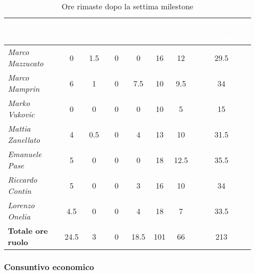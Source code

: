 \begin{table}[H]
    \renewcommand\arraystretch{1.5}
    \centering
    \begin{tabular}{|l|c|c|c|c|c|c|c|}
    \hline
    \rowcolor[HTML]{036400}
    \textcolor{white}{\textbf{Membro}} & \multicolumn{1}{c|}{\textcolor{white}{\textbf{RE}}} & \multicolumn{1}{c|}{\textcolor{white}{\textbf{AM}}} & \multicolumn{1}{c|}{\textcolor{white}{\textbf{AN}}} & \multicolumn{1}{c|}{\textcolor{white}{\textbf{PT}}} & \multicolumn{1}{c|}{\textcolor{white}{\textbf{PR}}} & \multicolumn{1}{c|}{\textcolor{white}{\textbf{VE}}} & \multicolumn{1}{c|}{\textcolor{white}{\textbf{Totale ore persona}}} \\ \hline
    \rowcolor[HTML]{EFEFEF}\textit{Marco Mazzucato}  & 0    & 1.5  & 0     & 0   & 16  & 12     & 29.5     \\ \hline
    \rowcolor[HTML]{C0C0C0}\textit{Marco Mamprin}    & 6    & 1    & 0     & 7.5  & 10  & 9.5   & 34     \\ \hline
    \rowcolor[HTML]{EFEFEF}\textit{Marko Vukovic}    & 0    & 0    & 0     & 0     & 10  & 5      & 15     \\ \hline
    \rowcolor[HTML]{C0C0C0}\textit{Mattia Zanellato} & 4    & 0.5  & 0     & 4     & 13  & 10     & 31.5     \\ \hline
    \rowcolor[HTML]{EFEFEF}\textit{Emanuele Pase}    & 5    & 0    & 0     & 0     & 18  & 12.5   & 35.5     \\ \hline
    \rowcolor[HTML]{C0C0C0}\textit{Riccardo Contin}  & 5    & 0    & 0     & 3     & 16  & 10     & 34     \\ \hline
    \rowcolor[HTML]{EFEFEF}\textit{Lorenzo Onelia}   & 4.5  & 0    & 0     & 4    & 18  & 7      & 33.5     \\ \hline
    \rowcolor[HTML]{C0C0C0}\textbf{Totale ore ruolo} & 24.5 & 3    & 0     & 18.5    & 101 & 66     & 213   \\ \hline
    \end{tabular}
    \caption{Ore rimaste dopo la settima milestone}
\end{table}

\subsubsection{Consuntivo economico}

